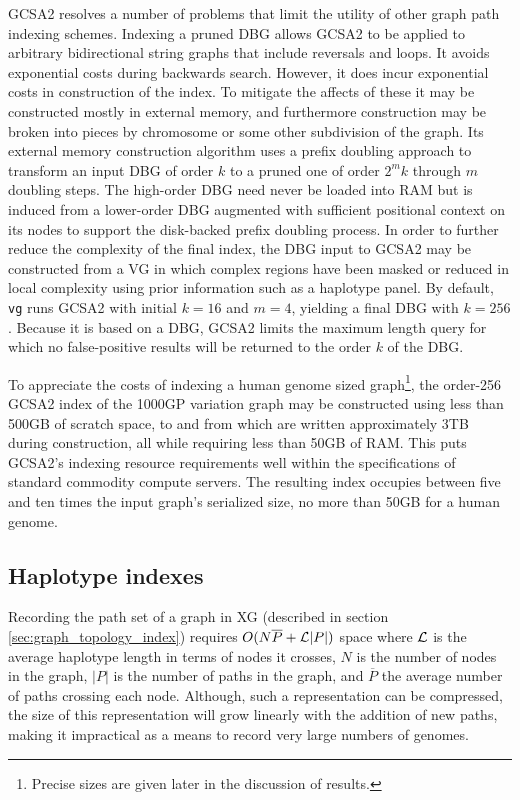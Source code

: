 GCSA2 resolves a number of problems that limit the utility of other graph path indexing schemes.
Indexing a pruned DBG allows GCSA2 to be applied to arbitrary bidirectional string graphs that include reversals and loops.
It avoids exponential costs during backwards search.
However, it does incur exponential costs in construction of the index.
To mitigate the affects of these it may be constructed mostly in external memory, and furthermore construction may be broken into pieces by chromosome or some other subdivision of the graph.
Its external memory construction algorithm uses a prefix doubling approach to transform an input DBG of order $k$ to a pruned one of order $2^mk$ through $m$ doubling steps.
The high-order DBG need never be loaded into RAM but is induced from a lower-order DBG augmented with sufficient positional context on its nodes to support the disk-backed prefix doubling process.
In order to further reduce the complexity of the final index, the DBG input to GCSA2 may be constructed from a VG in which complex regions have been masked or reduced in local complexity using prior information such as a haplotype panel.
By default, {\tt vg} runs GCSA2 with initial $k=16$ and $m=4$, yielding a final DBG with $k=256$.
Because it is based on a DBG, GCSA2 limits the maximum length query for which no false-positive results will be returned to the order $k$ of the DBG.

To appreciate the costs of indexing a human genome sized graph\footnote{Precise sizes are given later in the discussion of results.}, the order-256 GCSA2 index of the 1000GP variation graph may be constructed using less than 500GB of scratch space, to and from which are written approximately 3TB during construction, all while requiring less than 50GB of RAM.
This puts GCSA2's indexing resource requirements well within the specifications of standard commodity compute servers.
The resulting index occupies between five and ten times the input graph's serialized size, no more than 50GB for a human genome.

\subsection{Haplotype indexes}
Recording the path set of a graph in XG (described in section \ref{sec:graph_topology_index}) requires $O(N\overline{P} + {\cal L}|P|)$ space where ${\cal L}$ is the average haplotype length in terms of nodes it crosses, $N$ is the number of nodes in the graph, $|P|$ is the number of paths in the graph, and $\overline{P}$ the average number of paths crossing each node.
Although, such a representation can be compressed, the size of this representation will grow linearly with the addition of new paths, making it impractical as a means to record very large numbers of genomes.

